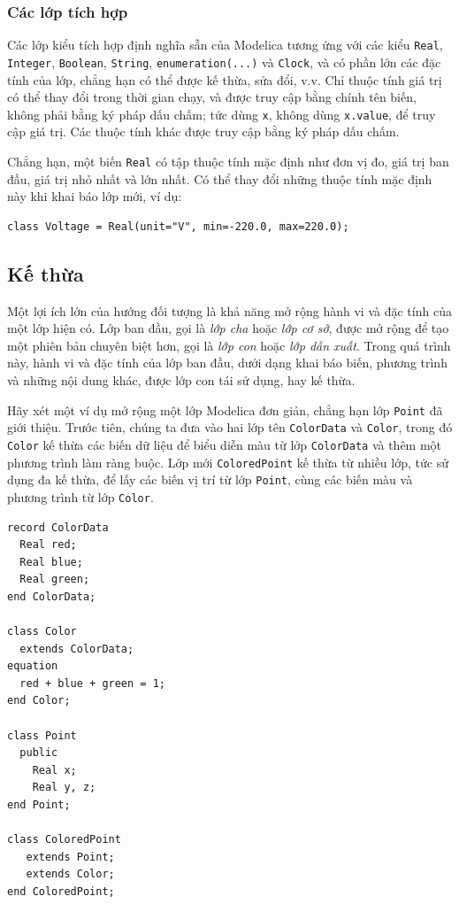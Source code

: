 \subsubsection{Các lớp tích hợp}
Các lớp kiểu tích hợp định nghĩa sẵn của Modelica tương ứng với các kiểu \texttt{Real}, \texttt{Integer}, \texttt{Boolean}, \texttt{String}, \texttt{enumeration(...)} và \texttt{Clock}, và có phần lớn các đặc tính của lớp, chẳng hạn có thể được kế thừa, sửa đổi, v.v. Chỉ thuộc tính giá trị có thể thay đổi trong thời gian chạy, và được truy cập bằng chính tên biến, không phải bằng ký pháp dấu chấm; tức dùng \texttt{x}, không dùng \texttt{x.value}, để truy cập giá trị. Các thuộc tính khác được truy cập bằng ký pháp dấu chấm.

Chẳng hạn, một biến \texttt{Real} có tập thuộc tính mặc định như đơn vị đo, giá trị ban đầu, giá trị nhỏ nhất và lớn nhất. Có thể thay đổi những thuộc tính mặc định này khi khai báo lớp mới, ví dụ:
\begin{verbatim}
class Voltage = Real(unit="V", min=-220.0, max=220.0);
\end{verbatim}

\subsection{Kế thừa}
Một lợi ích lớn của hướng đối tượng là khả năng mở rộng hành vi và đặc tính của một lớp hiện có. Lớp ban đầu, gọi là \emph{lớp cha} hoặc \emph{lớp cơ sở}, được mở rộng để tạo một phiên bản chuyên biệt hơn, gọi là \emph{lớp con} hoặc \emph{lớp dẫn xuất}. Trong quá trình này, hành vi và đặc tính của lớp ban đầu, dưới dạng khai báo biến, phương trình và những nội dung khác, được lớp con tái sử dụng, hay kế thừa.

Hãy xét một ví dụ mở rộng một lớp Modelica đơn giản, chẳng hạn lớp \texttt{Point} đã giới thiệu. Trước tiên, chúng ta đưa vào hai lớp tên \texttt{ColorData} và \texttt{Color}, trong đó \texttt{Color} kế thừa các biến dữ liệu để biểu diễn
màu từ lớp \texttt{ColorData} và thêm một phương trình làm ràng buộc. Lớp mới \texttt{ColoredPoint} kế thừa từ nhiều lớp, tức sử dụng đa kế thừa, để lấy các biến vị trí từ lớp \texttt{Point}, cùng các biến màu và phương trình từ lớp \texttt{Color}.
\begin{verbatim}
record ColorData
  Real red;
  Real blue;
  Real green;
end ColorData;

class Color
  extends ColorData;
equation
  red + blue + green = 1;
end Color;

class Point
  public
    Real x;
    Real y, z;
end Point;

class ColoredPoint
   extends Point;
   extends Color;
end ColoredPoint;
\end{verbatim}

